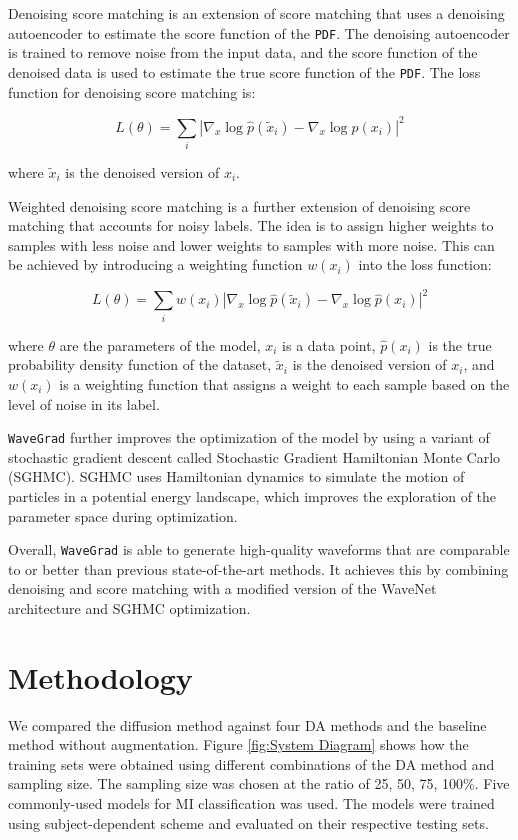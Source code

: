 \documentclass[runningheads]{llncs}
\begin{document}
Denoising score matching is an extension of score matching that uses a denoising autoencoder to estimate the score function of the \texttt{PDF}. The denoising autoencoder is trained to remove noise from the input data, and the score function of the denoised data is used to estimate the true score function of the \texttt{PDF}. The loss function for denoising score matching is:

\begin{equation}
L(\theta) = \sum_i |\nabla_x \log \hat{p}(\tilde{x}_i) - \nabla_x \log \hat{p}(x_i)|^2
\end{equation}

where $\tilde{x}_i$ is the denoised version of $x_i$.

Weighted denoising score matching is a further extension of denoising score matching that accounts for noisy labels. The idea is to assign higher weights to samples with less noise and lower weights to samples with more noise. This can be achieved by introducing a weighting function $w(x_i)$ into the loss function:

\begin{equation}
L(\theta) = \sum_i w(x_i) |\nabla_x \log \hat{p}(\tilde{x}_i) - \nabla_x \log \hat{p}(x_i)|^2
\end{equation}

where $\theta$ are the parameters of the model, $x_i$ is a data point, $\hat{p}(x_i)$ is the true probability density function of the dataset, $\tilde{x}_i$ is the denoised version of $x_i$, and $w(x_i)$ is a weighting function that assigns a weight to each sample based on the level of noise in its label.


\texttt{WaveGrad} further improves the optimization of the model by using a variant of stochastic gradient descent called Stochastic Gradient Hamiltonian Monte Carlo (SGHMC). SGHMC uses Hamiltonian dynamics to simulate the motion of particles in a potential energy landscape, which improves the exploration of the parameter space during optimization.

Overall, \texttt{WaveGrad} is able to generate high-quality waveforms that are comparable to or better than previous state-of-the-art methods. It achieves this by combining denoising and score matching with a modified version of the WaveNet architecture and SGHMC optimization.
\section{Methodology}
We compared the diffusion method against four DA methods and the baseline method without augmentation. Figure \ref{fig:System Diagram} shows how the training sets were obtained using different combinations of the DA method and sampling size.  The sampling size was chosen at the ratio of 25, 50, 75, 100\%.  Five commonly-used models for MI classification was used. The models were trained using subject-dependent scheme and evaluated on their respective testing sets. 
\end{document}

